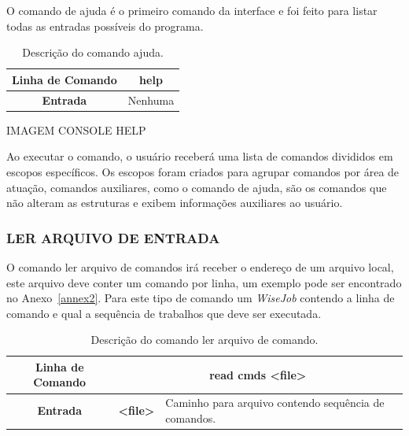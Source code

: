 \documentclass[a4paper,12pt]{monografia}
\theoremstyle{plain}
\theoremstyle{definition}
\theoremstyle{remark}
\begin{document}
O comando de ajuda é o primeiro comando da interface e foi feito para listar todas as entradas possíveis do programa.

\begin{center}
	\begin{table}[!htbp]
		\begin{tabular}{|c|m{}|}
			\hline
			\textbf{Linha de Comando} & \multicolumn{1}{c|}{help} \\
			\hline
			\textbf{Entrada} & Nenhuma \\
			\hline
		\end{tabular}
	\caption{Descrição do comando ajuda.}
	\label{tab:help}
	\end{table}
\end{center}

IMAGEM CONSOLE HELP

Ao executar o comando, o usuário receberá uma lista de comandos divididos em escopos específicos. Os escopos foram criados para agrupar comandos por área de atuação, comandos auxiliares, como o comando de ajuda, são os comandos que não alteram as estruturas e exibem informações auxiliares ao usuário.


\subsubsection{LER ARQUIVO DE ENTRADA}\label{sec:read_cmds}


O comando ler arquivo de comandos irá receber o endereço de um arquivo local, este arquivo deve conter um comando por linha, um exemplo pode ser encontrado no Anexo~\ref{annex2}. Para este tipo de comando um \textit{WiseJob} contendo a linha de comando e qual a sequência de trabalhos que deve ser executada.

\begin{center}
	\begin{table}[!htbp]
		\begin{tabular}{|c|c|m{}|}
			\hline
			\textbf{Linha de Comando} & \multicolumn{2}{c|}{read cmds <file>} \\
			\hline
			\textbf{Entrada} & \textbf{<file>} & Caminho para arquivo contendo sequência de comandos. \\
			\hline
		\end{tabular}
	\caption{Descrição do comando ler arquivo de comando.}
	\label{tab:read}
	\end{table}
\end{center}
\end{document}
